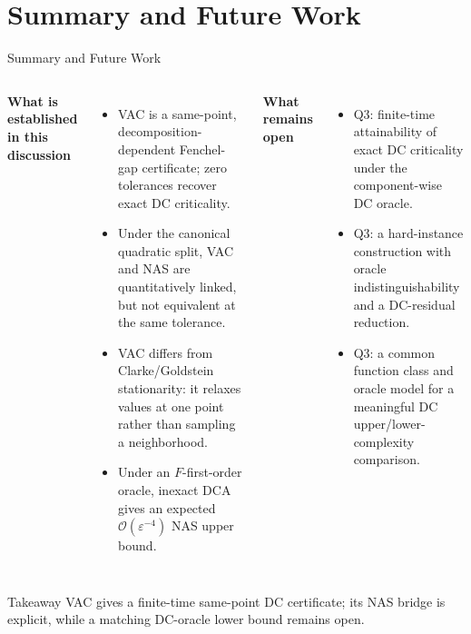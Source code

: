 \documentclass[10pt]{beamer}
\begin{document}
\section{Summary and Future Work}
\begin{frame}{Summary and Future Work}
\scriptsize
\begin{columns}[T,onlytextwidth]
\textbf{What is established in this discussion}
\begin{itemize}\setlength{\itemsep}{1pt}
    \item VAC is a same-point, decomposition-dependent Fenchel-gap
    certificate; zero tolerances recover exact DC criticality.
    \item Under the canonical quadratic split, VAC and NAS are
    quantitatively linked, but not equivalent at the same tolerance.
    \item VAC differs from Clarke/Goldstein stationarity: it relaxes values
    at one point rather than sampling a neighborhood.
    \item Under an $F$-first-order oracle, inexact DCA gives an expected
    $\mathcal O(\varepsilon^{-4})$ NAS upper bound.
\end{itemize}

\textbf{What remains open}
\begin{itemize}\setlength{\itemsep}{1pt}
    \item Q3: finite-time attainability of exact DC criticality under the
    component-wise DC oracle.
    \item Q3: a hard-instance construction with oracle
    indistinguishability and a DC-residual reduction.
    \item Q3: a common function class and oracle model for a meaningful
    DC upper/lower-complexity comparison.
\end{itemize}
\end{columns}

\vspace{0.15cm}
\begin{alertblock}{Takeaway}
VAC gives a finite-time same-point DC certificate; its NAS bridge is explicit,
while a matching DC-oracle lower bound remains open.
\end{alertblock}
\end{frame}
\end{document}

